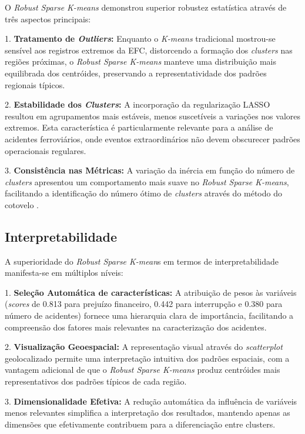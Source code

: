 \documentclass[conference]{IEEEtran}
\begin{document}
O \textit{Robust Sparse K-means} demonstrou superior robustez estatística através de três aspectos principais:

1. \textbf{Tratamento de \textit{Outliers}:} Enquanto o \textit{K-means} tradicional mostrou-se sensível aos registros extremos da EFC, distorcendo a formação dos \textit{clusters} nas regiões próximas, o \textit{Robust Sparse K-means} manteve uma distribuição mais equilibrada dos centróides, preservando a representatividade dos padrões regionais típicos.

2. \textbf{Estabilidade dos \textit{Clusters}:} A incorporação da regularização LASSO resultou em agrupamentos mais estáveis, menos suscetíveis a variações nos valores extremos. Esta característica é particularmente relevante para a análise de acidentes ferroviários, onde eventos extraordinários não devem obscurecer padrões operacionais regulares.

3. \textbf{Consistência nas Métricas:} A variação da inércia em função do número de \textit{clusters} apresentou um comportamento mais suave no \textit{Robust Sparse K-means}, facilitando a identificação do número ótimo de \textit{clusters} através do método do cotovelo  \cite{b4}.

\subsection{Interpretabilidade}
A superioridade do \textit{Robust Sparse K-mean}s em termos de interpretabilidade manifesta-se em múltiplos níveis:

1. \textbf{Seleção Automática de características:} A atribuição de pesos às variáveis (\textit{scores} de 0.813 para prejuízo financeiro, 0.442 para interrupção e 0.380 para número de acidentes) fornece uma hierarquia clara de importância, facilitando a compreensão dos fatores mais relevantes na caracterização dos acidentes.

2. \textbf{Visualização Geoespacial:} A representação visual através do \textit{scatterplot} geolocalizado permite uma interpretação intuitiva dos padrões espaciais, com a vantagem adicional de que o \textit{Robust Sparse K-means} produz centróides mais representativos dos padrões típicos de cada região.

3. \textbf{Dimensionalidade Efetiva:} A redução automática da influência de variáveis menos relevantes simplifica a interpretação dos resultados, mantendo apenas as dimensões que efetivamente contribuem para a diferenciação entre clusters.
\end{document}
